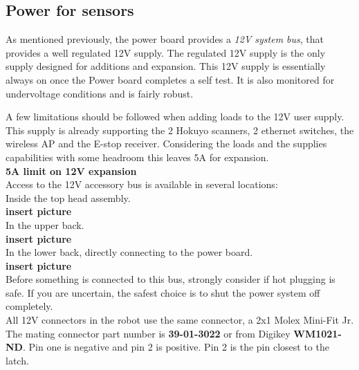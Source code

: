 \subsection{Power for sensors}
As mentioned previously, the power board provides a \emph{12V system bus}, that provides a well regulated 12V supply. The regulated 12V supply is the only supply designed for additions and expansion. This 12V supply is essentially always on once the Power board completes a self test. It is also monitored for undervoltage conditions and is fairly robust.


A few limitations should be followed when adding loads to the 12V user supply. This supply is already supporting the 2 Hokuyo scanners, 2 ethernet switches, the wireless AP and the E-stop receiver. Considering the loads and the supplies capabilities with some headroom this leaves 5A for expansion.\\

{\bf 5A limit on 12V expansion}\\

Access to the 12V accessory bus is available in several locations:\\

Inside the top head assembly.\\

{\bf insert picture}\\


In the upper back.\\

{\bf insert picture}\\


In the lower back, directly connecting to the power board.\\

{\bf insert picture}\\

Before something is connected to this bus, strongly consider if hot plugging is safe. If you are uncertain, the safest choice is to shut the power system off completely.\\

All 12V connectors in the robot use the same connector, a 2x1 Molex Mini-Fit Jr. The mating connector part number is {\bf 39-01-3022} or from Digikey {\bf WM1021-ND}. Pin one is negative and pin 2 is positive. Pin 2 is the pin closest to the latch.


